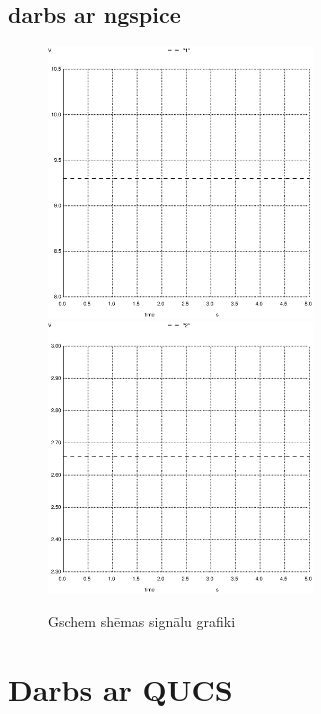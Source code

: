 \documentclass{report}
\begin{document}
\subsection{darbs ar ngspice}
\begin{figure}[h]
\includegraphics[width=7cm]{011.ps}
\includegraphics[width=7cm]{012.ps}
\caption{Gschem shēmas signālu grafiki }
\label{3}
\end{figure}


\section{Darbs ar QUCS}
\end{document}
